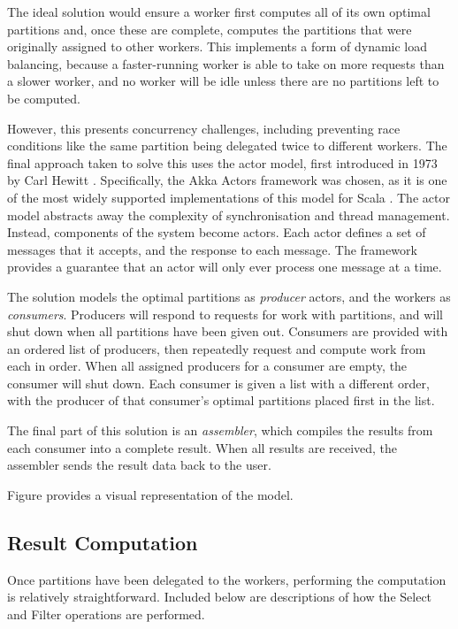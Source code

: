 The ideal solution would ensure a worker first computes all of its own optimal partitions and, once these are complete, computes the partitions that were originally assigned to other workers. This implements a form of dynamic load balancing, because a faster-running worker is able to take on more requests than a slower worker, and no worker will be idle unless there are no partitions left to be computed.

However, this presents concurrency challenges, including preventing race conditions like the same partition being delegated twice to different workers. The final approach taken to solve this uses the actor model, first introduced in 1973 by Carl Hewitt \cite{hewitt1973session}. Specifically, the Akka Actors framework was chosen, as it is one of the most widely supported implementations of this model for Scala . The actor model abstracts away the complexity of synchronisation and thread management. Instead, components of the system become actors. Each actor defines a set of messages that it accepts, and the response to each message. The framework provides a guarantee that an actor will only ever process one message at a time.

The solution models the optimal partitions as \textit{producer} actors, and the workers as \textit{consumers}. Producers will respond to requests for work with partitions, and will shut down when all partitions have been given out. Consumers are provided with an ordered list of producers, then repeatedly request and compute work from each in order. When all assigned producers for a consumer are empty, the consumer will shut down. Each consumer is given a list with a different order, with the producer of that consumer's optimal partitions placed first in the list. 

The final part of this solution is an \textit{assembler}, which compiles the results from each consumer into a complete result. When all results are received, the assembler sends the result data back to the user.

Figure  provides a visual representation of the model.


\subsection{Result Computation}
Once partitions have been delegated to the workers, performing the computation is relatively straightforward. Included below are descriptions of how the Select and Filter operations are performed.

